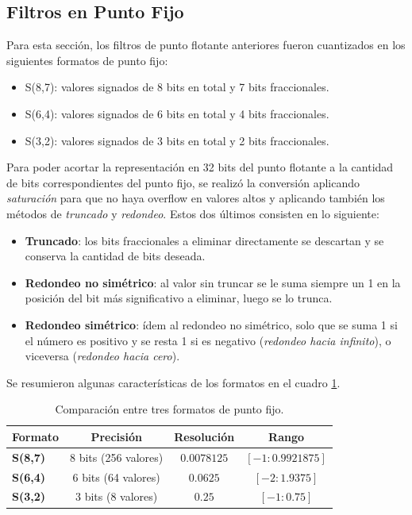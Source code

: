 \subsection{Filtros en Punto Fijo}

Para esta sección, los filtros de punto flotante anteriores fueron cuantizados en los siguientes formatos de punto fijo:

\begin{itemize}
    \item S(8,7): valores signados de 8 bits en total y 7 bits fraccionales.
    \item S(6,4): valores signados de 6 bits en total y 4 bits fraccionales.
    \item S(3,2): valores signados de 3 bits en total y 2 bits fraccionales.
\end{itemize}

Para poder acortar la representación en 32 bits del punto flotante a la cantidad de bits correspondientes del punto fijo, se realizó la conversión aplicando \emph{saturación} para que no haya overflow en valores altos y aplicando también los métodos de \emph{truncado} y \emph{redondeo}. Estos dos últimos consisten en lo siguiente:

\begin{itemize}
    \item \textbf{Truncado}: los bits fraccionales a eliminar directamente se descartan y se conserva la cantidad de bits deseada.
    \item \textbf{Redondeo no simétrico}: al valor sin truncar se le suma siempre un 1 en la posición del bit más significativo a eliminar, luego se lo trunca.
    \item \textbf{Redondeo simétrico}: ídem al redondeo no simétrico, solo que se suma 1 si el número es positivo y se resta 1 si es negativo (\emph{redondeo hacia infinito}), o viceversa (\emph{redondeo hacia cero}).
\end{itemize}

Se resumieron algunas características de los formatos en el cuadro \ref{tab:formatos}.

\begin{table}[H]
    \centering

    \begin{tabular}{lccc}
        \textbf{Formato} & \textbf{Precisión} & \textbf{Resolución} & \textbf{Rango} \\
        \hline\hline
        \textbf{S(8,7)} & 8 bits (256 valores) & $0.0078125$ & $[-1:0.9921875]$ \\
        \textbf{S(6,4)} & 6 bits (64 valores)  & $0.0625$    & $[-2:1.9375]$    \\
        \textbf{S(3,2)} & 3 bits (8 valores)   & $0.25$      & $[-1:0.75]$      \\
        \hline
    \end{tabular}

    \caption{Comparación entre tres formatos de punto fijo.}
    \label{tab:formatos}
\end{table}

